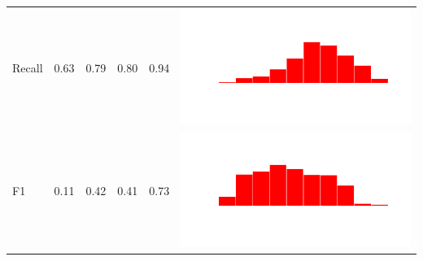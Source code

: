 \documentclass[conference]{IEEEtran}
\begin{document}
\begin{table}
\begin{tabular}{lrrrrc}
    Recall & 0.63 & 0.79 & 0.80 & 0.94 & \includegraphics[scale = 0.1, clip = true, trim= 50px 60px 50px 60px]{../figs/hist-results/hist-NBrec.pdf} \\
    F1 & 0.11 & 0.42 & 0.41 & 0.73 & \includegraphics[scale = 0.1, clip = true, trim= 50px 60px 50px 60px]{../figs/hist-results/hist-NBf1.pdf} \\


\end{tabular}
\end{table}
\end{document}

